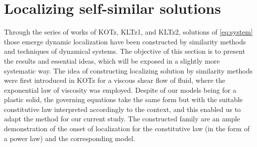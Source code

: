 \documentclass[a4paper,11pt]{article}
\theoremstyle{remark}
\begin{document}
\section{Localizing self-similar solutions}
Through the series of works of KOTz, KLTz1, and KLTz2, solutions of \eqref{eq:system} those emerge dynamic localization have been constructed by similarity methods and techniques of dynamical systems. The objective of this section is to present the results and essential ideas, which will be exposed in a slightly more systematic way. The idea of constructing localizing solution by similarity methods were first introduced in KOTz for a viscous shear flow of fluid, where the exponential law of viscosity was employed. Despite of our models being for a plastic solid, the governing equations take the same form but with the suitable constitutive law interpreted accordingly to the context, and this enabled us to adapt the method for our current study. The constructed family are an ample demonstration of the onset of localization for the constitutive law (in the form of a power law) and the corresponding model. 
\end{document}
